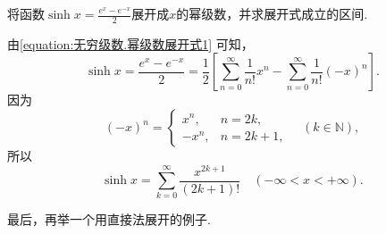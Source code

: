\begin{example}
将函数\(\sinh x = \frac{e^x - e^{-x}}{2}\)展开成\(x\)的幂级数，并求展开式成立的区间.
\begin{solution}
由\cref{equation:无穷级数.幂级数展开式1} 可知，\begin{equation*}
	\sinh x
	= \frac{e^x - e^{-x}}{2}
	= \frac{1}{2} \left[
	\sum_{n=0}^\infty \frac{1}{n!} x^n
	- \sum_{n=0}^\infty \frac{1}{n!} (-x)^n
	\right].
\end{equation*}
因为\begin{equation*}
	(-x)^n = \left\{ \begin{array}{cl}
		x^n, & n=2k, \\
		-x^n, & n=2k+1,
	\end{array} \right.
	\quad(k\in\mathbb{N}),
\end{equation*}
所以\begin{equation*}
	\sinh x
	= \sum_{k=0}^\infty \frac{x^{2k+1}}{(2k+1)!}
	\quad(-\infty<x<+\infty).
\end{equation*}
\end{solution}
\end{example}

最后，再举一个用直接法展开的例子.

